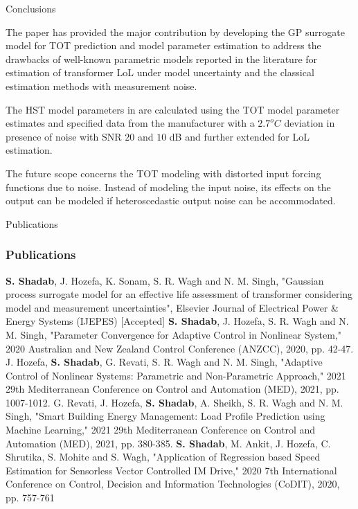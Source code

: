 \documentclass[10pt,hyperref={pdfpagelabels=false}]{beamer}
\begin{document}
\begin{frame}{Conclusions}
\begin{exampleblock}{}
 The paper has provided the major contribution by developing the GP surrogate model for TOT prediction and model parameter estimation to address the drawbacks of well-known parametric models reported in the literature for estimation of transformer LoL under model uncertainty and the classical estimation methods with measurement noise.
\end{exampleblock}
\begin{block}{}
The HST model parameters in are calculated using the TOT model parameter estimates and specified data from the manufacturer with a $2.7^oC$ deviation in presence of noise with SNR $20$ and $10$ dB and further extended for LoL estimation.
\end{block}
\begin{alertblock}{}
The future scope concerns the TOT modeling with distorted input forcing functions due to noise. Instead of modeling the input noise, its effects on the output can be modeled if heteroscedastic output noise can be accommodated.
\end{alertblock}
    
\end{frame}
\begin{frame}{Publications}
\frametitle{Publications}
\footnotesize{
\begin{thebibliography}{99}
 \textbf{S. Shadab}, J. Hozefa, K. Sonam, S. R. Wagh and N. M. Singh, "Gaussian process surrogate model for an effective life assessment of transformer considering model and measurement uncertainties",  Elsevier Journal of Electrical Power & Energy Systems (IJEPES) [Accepted]
\textbf{S. Shadab}, J. Hozefa, S. R. Wagh and N. M. Singh, "Parameter Convergence for Adaptive Control in Nonlinear System," 2020 Australian and New Zealand Control Conference (ANZCC), 2020, pp. 42-47.
 J. Hozefa, \textbf{S. Shadab}, G. Revati, S. R. Wagh and N. M. Singh, "Adaptive Control of Nonlinear Systems: Parametric and Non-Parametric Approach," 2021 29th Mediterranean Conference on Control and Automation (MED), 2021, pp. 1007-1012.
G. Revati, J. Hozefa, \textbf{S. Shadab}, A. Sheikh, S. R. Wagh and N. M. Singh, "Smart Building Energy Management: Load Profile Prediction using Machine Learning," 2021 29th Mediterranean Conference on Control and Automation (MED), 2021, pp. 380-385.
\textbf{S. Shadab}, M. Ankit, J. Hozefa, C. Shrutika, S. Mohite and S. Wagh, "Application of Regression based Speed Estimation for Sensorless Vector Controlled IM Drive," 2020 7th International Conference on Control, Decision and Information Technologies (CoDIT), 2020, pp. 757-761
\end{thebibliography}
}
\end{frame}
\end{document}
